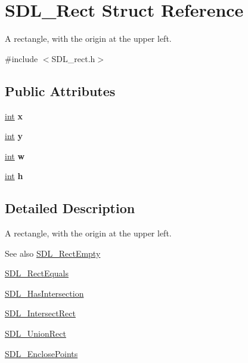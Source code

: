 \hypertarget{structSDL__Rect}{}\section{S\+D\+L\+\_\+\+Rect Struct Reference}
\label{structSDL__Rect}


A rectangle, with the origin at the upper left.  




{\ttfamily \#include $<$S\+D\+L\+\_\+rect.\+h$>$}

\subsection*{Public Attributes}
\begin{DoxyCompactItemize}
\item 
\hypertarget{structSDL__Rect_a85418d94621dd6855805c4b5c7bf6482}{}\hyperlink{SDL__thread_8h_a6a64f9be4433e4de6e2f2f548cf3c08e}{int} {\bfseries x}\label{structSDL__Rect_a85418d94621dd6855805c4b5c7bf6482}

\item 
\hypertarget{structSDL__Rect_a822694af8ddca5fd0d5d94e47106ab85}{}\hyperlink{SDL__thread_8h_a6a64f9be4433e4de6e2f2f548cf3c08e}{int} {\bfseries y}\label{structSDL__Rect_a822694af8ddca5fd0d5d94e47106ab85}

\item 
\hypertarget{structSDL__Rect_a56b7be5738fb6fab86881534a814c45e}{}\hyperlink{SDL__thread_8h_a6a64f9be4433e4de6e2f2f548cf3c08e}{int} {\bfseries w}\label{structSDL__Rect_a56b7be5738fb6fab86881534a814c45e}

\item 
\hypertarget{structSDL__Rect_a0a17d46b320af8063b746153348edd72}{}\hyperlink{SDL__thread_8h_a6a64f9be4433e4de6e2f2f548cf3c08e}{int} {\bfseries h}\label{structSDL__Rect_a0a17d46b320af8063b746153348edd72}

\end{DoxyCompactItemize}


\subsection{Detailed Description}
A rectangle, with the origin at the upper left. 

\begin{DoxySeeAlso}{See also}
\hyperlink{SDL__rect_8h_aac0e9b5d3f34baec6a2cde95bb01f49c}{S\+D\+L\+\_\+\+Rect\+Empty} 

\hyperlink{SDL__rect_8h_a156979fd3561cf90b87741d11057262a}{S\+D\+L\+\_\+\+Rect\+Equals} 

\hyperlink{SDL__rect_8h_a191ec0b069421d4a36304b475697e847}{S\+D\+L\+\_\+\+Has\+Intersection} 

\hyperlink{SDL__rect_8h_aff8e3dd3b1a25443cd7c8cf02a087290}{S\+D\+L\+\_\+\+Intersect\+Rect} 

\hyperlink{SDL__rect_8h_a659f2c25335202888408c95195823f9c}{S\+D\+L\+\_\+\+Union\+Rect} 

\hyperlink{SDL__rect_8h_afcbb58dbba760b9e6fdb4b5d1ece015c}{S\+D\+L\+\_\+\+Enclose\+Points} 
\end{DoxySeeAlso}


